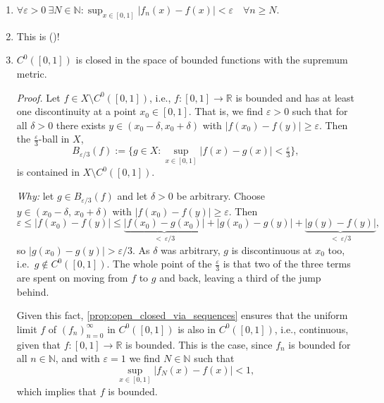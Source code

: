 \begin{exercisesolution}
\begin{enumerate}[label=\textbf{(\alph*)}]
  \item $\displaystyle \forall \varepsilon > 0 \ \exists N \in \mathbb{N} : \sup_{x \in [0,1]} |f_n(x) - f(x)| < \varepsilon \quad \forall n \geq N$.
  \item This is  ()!
  \item $C^0([0,1])$ is closed in the space of bounded functions with the supremum metric.

    \textit{Proof.} Let $f \in X \setminus C^0([0,1])$, i.e., $f : [0,1] \to \mathbb{R}$ is
    bounded and has at least one discontinuity at a point $x_0 \in [0,1]$. That is, we find
    $\varepsilon > 0$ such that for all $\delta > 0$ there exists $y \in (x_0 - \delta, x_0 +
    \delta)$ with $|f(x_0) - f(y)| \geq \varepsilon$. Then the $\tfrac{\varepsilon}{3}$-ball in
    $X$,
    \[
    B_{\varepsilon/3}(f) := \Big\{ g \in X : \sup_{x \in [0,1]} |f(x) - g(x)| < \tfrac{\varepsilon}{3} \Big\},
    \]
    is contained in $X \setminus C^0([0,1])$.

    \textit{Why:} let $g \in B_{\varepsilon/3}(f)$ and let $\delta > 0$ be arbitrary. Choose
    $y \in (x_0-\delta,\,x_0+\delta)$ with $|f(x_0)-f(y)| \geq \varepsilon$. Then
    \[\varepsilon \leq |f(x_0)-f(y)|
      \leq \underbrace{|f(x_0)-g(x_0)|}_{<\ \varepsilon/3}
         + |g(x_0)-g(y)|
         + \underbrace{|g(y)-f(y)|}_{<\ \varepsilon/3},\]
    so $|g(x_0)-g(y)| > \varepsilon/3$. As $\delta$ was arbitrary, $g$ is discontinuous at
    $x_0$ too, i.e.\ $g \notin C^0([0,1])$. The whole point of the $\tfrac{\varepsilon}{3}$ is
    that two of the three terms are spent on moving from $f$ to $g$ and back, leaving a third
    of the jump behind.

    Given this fact, \cref{prop:open_closed_via_sequences} ensures that the uniform limit $f$ of
    $(f_n)_{n=0}^{\infty}$ in $C^0([0,1])$ is also in $C^0([0,1])$, i.e., continuous, given that
    $f : [0,1] \to \mathbb{R}$ is bounded. This is the case, since $f_n$ is bounded for all
    $n \in \mathbb{N}$, and with $\varepsilon = 1$ we find $N \in \mathbb{N}$ such that
    \[
    \sup_{x \in [0,1]} |f_N(x) - f(x)| < 1,
    \]
    which implies that $f$ is bounded.
\end{enumerate}
\end{exercisesolution}

